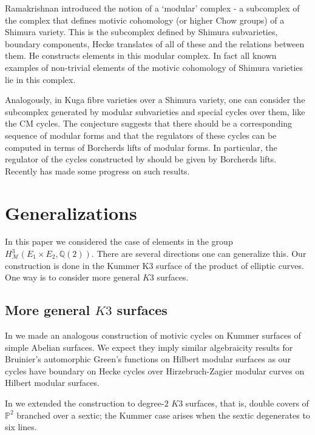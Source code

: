 \documentclass[11pt,a4paper]{article}
\newcommand {\Q}{{\mathds Q}}
\newcommand {\M}{{\mathcal M}}
\newcommand {\CP}{{\mathds P}}
\begin{document}
\fi

Ramakrishnan \cite{rama} introduced the notion of a `modular' complex - a subcomplex of the complex that defines motivic cohomology (or higher Chow groups) of a Shimura variety. This is the subcomplex defined by Shimura subvarieties, boundary components, Hecke translates of all of these and the relations between them. He constructs elements in this modular complex. In fact all known examples of non-trivial elements of the motivic cohomology of Shimura varieties lie in this complex. 

Analogously, in Kuga fibre varieties over a  Shimura variety, one can consider the subcomplex generated by modular subvarieties and special cycles over them, like the CM cycles. The conjecture suggests that there should be a corresponding sequence of modular forms and that the regulators of these cycles can be computed in terms of Borcherds lifts of modular forms. In particular, the regulator of the cycles constructed by \cite{rama} should be given by Borcherds lifts. Recently \cite{ma2026} has made some progress on such results. 



\section{Generalizations}

In this paper we considered the case of elements in the group $H^3_{\M}(E_1 \times E_2,\Q(2))$. There are several directions one can generalize this. Our construction is done in the Kummer K3 surface of the product of elliptic curves. One way is to consider more general $K3$ surfaces.


\subsection{More general $K3$ surfaces}

In \cite{sree-simple} we made an analogous construction of motivic cycles on  Kummer surfaces of simple Abelian surfaces. We expect they   imply similar algebraicity results for Bruinier's automorphic  Green's functions on Hilbert modular surfaces as our cycles have boundary on Hecke cycles over Hirzebruch-Zagier modular curves on Hilbert modular surfaces.  


In \cite{sreeK3} we extended the construction to degree-$2$ $K3$ surfaces, that is,  double covers of $\CP^2$ branched over a sextic; the Kummer case arises when the sextic degenerates to six lines.
 
\end{document}
